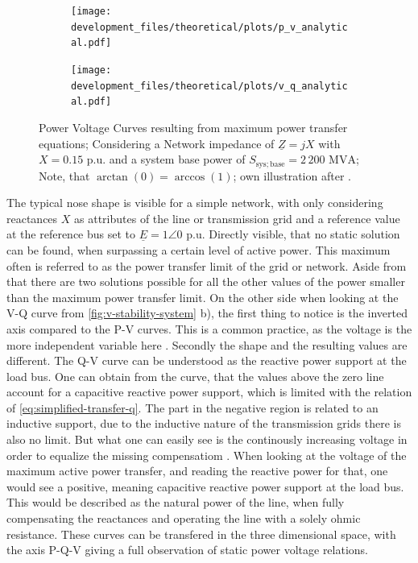 \begin{figure}[htbp!]
    \centering
    \begin{subfigure}[b]{.49\linewidth}
        \texttt{[image: development\_files/theoretical/plots/p\_v\_analytical.pdf]}
    \end{subfigure}
    \begin{subfigure}[b]{.49\linewidth}
        \texttt{[image: development\_files/theoretical/plots/v\_q\_analytical.pdf]}
    \end{subfigure}
    \caption[Power Voltage Curves resulting from maximum power transfer equations]{Power Voltage Curves resulting from maximum power transfer equations; Considering a Network impedance of $\underline{Z}=jX$ with $X=0.15\text{ p.u.}$ and a system base power of $S_\mathrm{sys;base}=2\,200\text{ MVA}$; Note, that $\arctan(0) = \arccos(1)$; own illustration after \autocite{machowski_2020,kundur_2022,cutsem_1998}.}
    \label{fig:v-stability-system}
\end{figure}

The typical nose shape is visible for a simple network, with only considering reactances $X$ as attributes of the line or transmission grid and a reference value at the reference bus set to $\underline{E}=1\angle0$ p.u.
Directly visible, that no static solution can be found, when surpassing a certain level of active power. 
This maximum often is referred to as the power transfer limit of the grid or network.
Aside from that there are two solutions possible for all the other values of the power smaller than the maximum power transfer limit.
On the other side when looking at the V-Q curve from \autoref{fig:v-stability-system} b), the first thing to notice is the inverted axis compared to the P-V curves.
This is a common practice, as the voltage is the more independent variable here \autocite{kundur_2022}.
Secondly the shape and the resulting values are different.
The Q-V curve can be understood as the reactive power support at the load bus.
One can obtain from the curve, that the values above the zero line account for a capacitive reactive power support, which is limited with the relation of \autoref{eq:simplified-transfer-q}.
The part in the negative region is related to an inductive support, due to the inductive nature of the transmission grids there is also no limit.
But what one can easily see is the continously increasing voltage in order to equalize the missing compensatiom \autocite{kundur_2022}.
When looking at the voltage of the maximum active power transfer, and reading the reactive power for that, one would see a positive, meaning capacitive reactive power support at the load bus.
This would be described as the natural power of the line, when fully compensating the reactances and operating the line with a solely ohmic resistance.
These curves can be transfered in the three dimensional space, with the axis P-Q-V giving a full observation of static power voltage relations.

